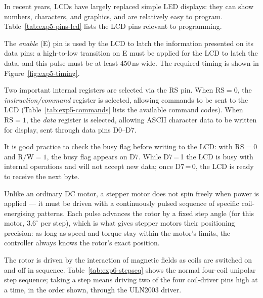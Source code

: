 \begin{introduction}
  In recent years, LCDs have largely replaced simple LED displays: they can show numbers, characters, and graphics, and are relatively easy to program. Table~\ref{tab:exp5-pins-lcd} lists the LCD pins relevant to programming.
  \vspace*{10pt}

  The \textit{enable} (E) pin is used by the LCD to latch the information presented on its data pins: a high-to-low transition on E must be applied for the LCD to latch the data, and this pulse must be at least 450\,ns wide. The required timing is shown in Figure~\ref{fig:exp5-timing}.
  \vspace*{10pt}

  Two important internal registers are selected via the RS pin. When $\text{RS}=0$, the \textit{instruction/command} register is selected, allowing commands to be sent to the LCD (Table~\ref{tab:exp5-commands} lists the available command codes). When $\text{RS}=1$, the \textit{data} register is selected, allowing ASCII character data to be written for display, sent through data pins D0--D7.
  \vspace*{10pt}

  It is good practice to check the busy flag before writing to the LCD: with $\text{RS}=0$ and $\text{R}/\overline{\text{W}}=1$, the busy flag appears on D7. While D7\,=\,1 the LCD is busy with internal operations and will not accept new data; once D7\,=\,0, the LCD is ready to receive the next byte.
  \vspace*{10pt}

  Unlike an ordinary DC motor, a stepper motor does not spin freely when power is applied --- it must be driven with a continuously pulsed sequence of specific coil-energising patterns. Each pulse advances the rotor by a fixed step angle (for this motor, $3.6^\circ$ per step), which is what gives stepper motors their positioning precision: as long as speed and torque stay within the motor's limits, the controller always knows the rotor's exact position.
  \vspace*{1.5em}

  The rotor is driven by the interaction of magnetic fields as coils are switched on and off in sequence. Table~\ref{tab:exp6-stepseq} shows the normal four-coil unipolar step sequence; taking a step means driving two of the four coil-driver pins high at a time, in the order shown, through the ULN2003 driver.
\end{introduction}

